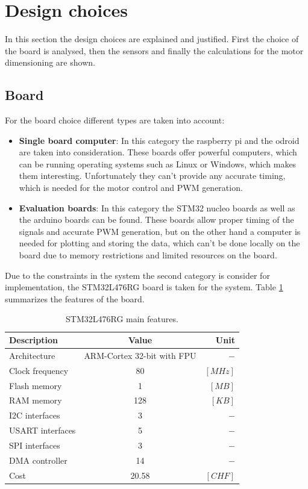 \documentclass[12pt,a4paper, twoside]{article}
\begin{document}
\section{Design choices}\label{sec:design}
In this section the design choices are explained and justified. First the choice of the board is analysed, then the sensors and finally the calculations for the motor dimensioning are shown.
\subsection{Board}
For the board choice different types are taken into account:
\begin{itemize}
	\item \textbf{Single board computer}: In this category the raspberry pi and the odroid are taken into consideration. These boards offer powerful computers, which can be running operating systems such as Linux or Windows, which makes them interesting. Unfortunately they can't provide any accurate timing,  which is needed for the motor control and PWM generation.
	\item \textbf{Evaluation boards}: In this category the STM32 nucleo boards as well as the arduino boards can be found. These boards allow proper timing of the signals and accurate PWM generation, but on the other hand a computer is needed for plotting and storing the data, which can't be done locally on the board due to memory restrictions and limited resources on the board.
\end{itemize}
Due to the constraints in the system the second category is consider for implementation, the STM32L476RG board is taken for the system. Table \ref{tab:board} summarizes the features of the board.
\begin{table}[H]
	\centering
	\begin{tabular}{l||c|r} 
		\textbf{Description}&\textbf{Value}  &\textbf{Unit}  \\ 
		\hline
		\hline 
		Architecture & ARM-Cortex 32-bit with FPU & $-$ \\ 
		\hline 
		Clock frequency & 80  & $[MHz]$  \\ 
		\hline 
		Flash memory & 1 & $[MB]$ \\ 
		\hline 
		RAM memory & 128 & $[KB]$  \\ 
		\hline 
		I2C interfaces & 3 & $-$  \\ 
		\hline 
		USART interfaces & 5  & $-$  \\ 
		\hline 
		SPI interfaces & 3  & $-$  \\  
		\hline 
		DMA controller & 14 & $-$  \\
		\hline
		Cost & 20.58 &$[CHF]$
	\end{tabular} 
	\caption{STM32L476RG main features.}
	\label{tab:board}
\end{table}
\end{document}
